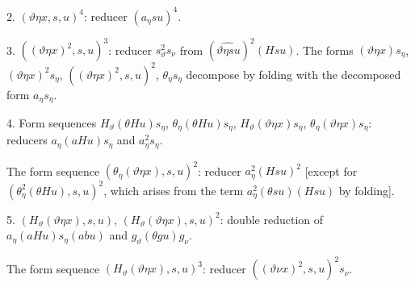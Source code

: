 \documentclass[11pt]{article}
\begin{document}
2. $(\vartheta\eta x,s,u)^4$: reducer $(a_\eta su)^4$.

3. $((\vartheta\eta x)^2,s,u)^3$: reducer $s_\vartheta^2s_\nu$ from $(\widehat{\vartheta\eta su})^2(Hsu)$. The forms $(\vartheta\eta x)s_\eta$, $(\vartheta\eta x)^2s_\eta$, $((\vartheta\eta x)^2,s,u)^2$, $\theta_\eta s_\eta$ decompose by folding with the decomposed form $a_\eta s_\eta$.

4. Form sequences $H_\vartheta(\theta Hu)s_\eta$, $\theta_\eta(\theta Hu)s_\eta$, $H_\vartheta(\vartheta\eta x)s_\eta$, $\theta_\eta(\vartheta\eta x)s_\eta$: reducers $a_\eta(aHu)s_\eta$ and $a_\eta^2s_\eta$.

The form sequence $(\theta_\eta(\vartheta\eta x),s,u)^2$: reducer $a_\eta^2(Hsu)^2$ [except for $(\theta_\eta^2(\theta Hu),s,u)^2$, which arises from the term $a_\eta^2(\theta su)(Hsu)$ by folding].

5. $(H_\vartheta(\vartheta\eta x),s,u)$, $(H_\vartheta(\vartheta\eta x),s,u)^2$: double reduction of $a_\eta(aHu)s_\eta(abu)$ and $g_\vartheta(\theta gu)g_\nu$.

The form sequence $(H_\vartheta(\vartheta\eta x),s,u)^3$: reducer $((\vartheta\nu x)^2,s,u)^2s_\nu$.
\end{document}
